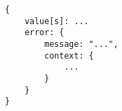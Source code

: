 \begin{lstlisting}[language=plain,caption={Shape of the \acrshort{api} responses},label=code:api_response_shape,float,floatplacement=H]
{
    value[s]: ...
    error: {
        message: "...",
        context: {
            ...
        }
    }
}
\end{lstlisting}